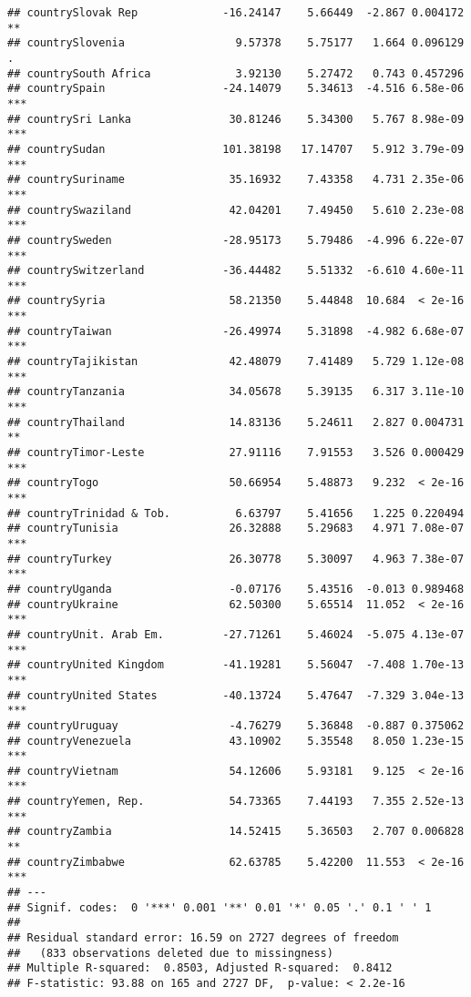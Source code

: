 \documentclass[
  11pt,
]{article}
\begin{document}
\begin{verbatim}
## countrySlovak Rep             -16.24147    5.66449  -2.867 0.004172 ** 
## countrySlovenia                 9.57378    5.75177   1.664 0.096129 .  
## countrySouth Africa             3.92130    5.27472   0.743 0.457296    
## countrySpain                  -24.14079    5.34613  -4.516 6.58e-06 ***
## countrySri Lanka               30.81246    5.34300   5.767 8.98e-09 ***
## countrySudan                  101.38198   17.14707   5.912 3.79e-09 ***
## countrySuriname                35.16932    7.43358   4.731 2.35e-06 ***
## countrySwaziland               42.04201    7.49450   5.610 2.23e-08 ***
## countrySweden                 -28.95173    5.79486  -4.996 6.22e-07 ***
## countrySwitzerland            -36.44482    5.51332  -6.610 4.60e-11 ***
## countrySyria                   58.21350    5.44848  10.684  < 2e-16 ***
## countryTaiwan                 -26.49974    5.31898  -4.982 6.68e-07 ***
## countryTajikistan              42.48079    7.41489   5.729 1.12e-08 ***
## countryTanzania                34.05678    5.39135   6.317 3.11e-10 ***
## countryThailand                14.83136    5.24611   2.827 0.004731 ** 
## countryTimor-Leste             27.91116    7.91553   3.526 0.000429 ***
## countryTogo                    50.66954    5.48873   9.232  < 2e-16 ***
## countryTrinidad & Tob.          6.63797    5.41656   1.225 0.220494    
## countryTunisia                 26.32888    5.29683   4.971 7.08e-07 ***
## countryTurkey                  26.30778    5.30097   4.963 7.38e-07 ***
## countryUganda                  -0.07176    5.43516  -0.013 0.989468    
## countryUkraine                 62.50300    5.65514  11.052  < 2e-16 ***
## countryUnit. Arab Em.         -27.71261    5.46024  -5.075 4.13e-07 ***
## countryUnited Kingdom         -41.19281    5.56047  -7.408 1.70e-13 ***
## countryUnited States          -40.13724    5.47647  -7.329 3.04e-13 ***
## countryUruguay                 -4.76279    5.36848  -0.887 0.375062    
## countryVenezuela               43.10902    5.35548   8.050 1.23e-15 ***
## countryVietnam                 54.12606    5.93181   9.125  < 2e-16 ***
## countryYemen, Rep.             54.73365    7.44193   7.355 2.52e-13 ***
## countryZambia                  14.52415    5.36503   2.707 0.006828 ** 
## countryZimbabwe                62.63785    5.42200  11.553  < 2e-16 ***
## ---
## Signif. codes:  0 '***' 0.001 '**' 0.01 '*' 0.05 '.' 0.1 ' ' 1
## 
## Residual standard error: 16.59 on 2727 degrees of freedom
##   (833 observations deleted due to missingness)
## Multiple R-squared:  0.8503, Adjusted R-squared:  0.8412 
## F-statistic: 93.88 on 165 and 2727 DF,  p-value: < 2.2e-16
\end{verbatim}
\end{document}
